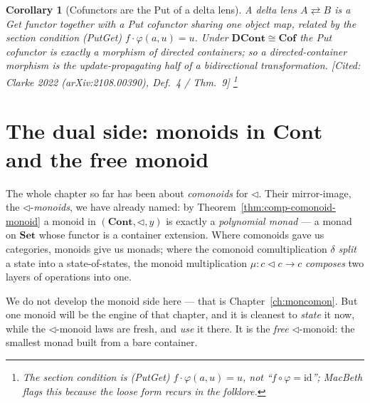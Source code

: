 \documentclass[11pt,a4paper]{book}
\newcommand{\Set}{\mathbf{Set}}
\newcommand{\Cof}{\mathbf{Cof}}
\newcommand{\Cont}{\mathbf{Cont}}
\newcommand{\DCont}{\mathbf{DCont}}
\newcommand{\id}{\mathrm{id}}
\theoremstyle{plain}
\newtheorem{Corollary}[Theorem]{Corollary}
\theoremstyle{definition}
\theoremstyle{remark}
\newcommand{\prov}[1]{\hfill\textsf{\footnotesize[#1]}}
\begin{document}
\begin{Corollary}[Cofunctors are the Put of a delta lens]\label{cor:lens}
A \emph{delta lens} $A\rightleftarrows B$ is a \emph{Get} functor together with a
\emph{Put} cofunctor sharing one object map, related by the section condition
(PutGet) $f\cdot\varphi(a,u)=u$. Under $\DCont\cong\Cof$ the Put cofunctor is
exactly a morphism of directed containers; so a directed-container morphism is the
update-propagating half of a bidirectional transformation.
\prov{Cited: Clarke 2022 (arXiv:2108.00390), Def.\ 4 / Thm.\ 9}%
\footnote{The section condition is (PutGet) $f\cdot\varphi(a,u)=u$, \emph{not}
``$f\circ\varphi=\id$''; MacBeth flags this because the loose form recurs in the
folklore.}
\end{Corollary}

\section{The dual side: monoids in \texorpdfstring{$\Cont$}{Cont} and the free monoid}
\label{sec:ch6-monoids}

The whole chapter so far has been about \emph{comonoids} for $\triangleleft$. Their
mirror-image, the $\triangleleft$-\emph{monoids}, we have already named: by
Theorem~\ref{thm:comp-comonoid-monoid} a monoid in $(\Cont,\triangleleft,y)$ is exactly a
\emph{polynomial monad} --- a monad on $\Set$ whose functor is a container extension. Where
comonoids gave us categories, monoids give us monads; where the comonoid comultiplication
$\delta$ \emph{split} a state into a state-of-states, the monoid multiplication $\mu\colon
c\triangleleft c\to c$ \emph{composes} two layers of operations into one.

We do not develop the monoid side here --- that is Chapter~\ref{ch:moncomon}. But one monoid
will be the engine of that chapter, and it is cleanest to \emph{state} it now, while the
$\triangleleft$-monoid laws are fresh, and \emph{use} it there. It is the \emph{free}
$\triangleleft$-monoid: the smallest monad built from a bare container.
\end{document}
